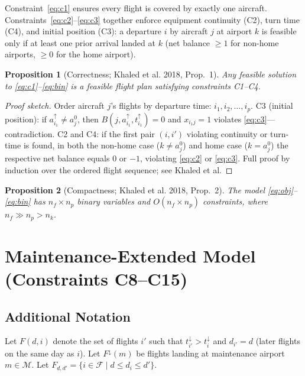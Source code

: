 \documentclass[11pt, a4paper]{article}
\theoremstyle{plain}
\newtheorem{proposition}{Proposition}
\theoremstyle{definition}
\theoremstyle{remark}
\newcommand{\F}{\mathcal{F}}        %
\newcommand{\MA}{\mathcal{M}}       %
\newcommand{\aD}[1]{a^{\uparrow}_{#1}}          %
\newcommand{\tI}[1]{t^{\downarrow}_{#1}}        %
\newcommand{\tD}[1]{t^{\uparrow}_{#1}}          %
\begin{document}
Constraint~\eqref{eq:c1} ensures every flight is covered by exactly one aircraft.
Constraints~\eqref{eq:c2}--\eqref{eq:c3} together enforce equipment continuity
(C2), turn time (C4), and initial position (C3): a departure $i$ by aircraft $j$
at airport $k$ is feasible only if at least one prior arrival landed at $k$ (net
balance $\geq 1$ for non-home airports, $\geq 0$ for the home airport).

\begin{proposition}[Correctness; Khaled et al. 2018, Prop.~1]
  Any feasible solution to \eqref{eq:c1}--\eqref{eq:bin} is a feasible flight plan
  satisfying constraints C1--C4.
\end{proposition}
\begin{proof}[Proof sketch]
  Order aircraft $j$'s flights by departure time: $i_1, i_2, \ldots, i_p$.
  C3 (initial position): if $\aD{i_1} \neq a^0_j$, then $B(j, \aD{i_1}, \tD{i_1}) = 0$
  and $x_{i_1 j} = 1$ violates \eqref{eq:c3}—contradiction.
  C2 and C4: if the first pair $(i, i')$ violating continuity or turn-time is found,
  in both the non-home case ($k \neq a^0_j$) and home case ($k = a^0_j$) the
  respective net balance equals 0 or $-1$, violating \eqref{eq:c2} or \eqref{eq:c3}.
  Full proof by induction over the ordered flight sequence; see Khaled et al.
\end{proof}

\begin{proposition}[Compactness; Khaled et al. 2018, Prop.~2]
  The model \eqref{eq:obj}--\eqref{eq:bin} has $n_f \times n_p$ binary variables
  and $O(n_f \times n_p)$ constraints, where $n_f \gg n_p > n_k$.
\end{proposition}

\section{Maintenance-Extended Model (Constraints C8--C15)}

\subsection{Additional Notation}

Let $F(d, i)$ denote the set of flights $i'$ such that $\tI{i'} > \tI{i}$ and
$d_{i'} = d$ (later flights on the same day as $i$).
Let $F^{\downarrow}(m)$ be flights landing at maintenance airport $m \in \MA$.
Let $F_{d,d'} = \{i \in \F \mid d \leq d_i \leq d'\}$.
\end{document}
